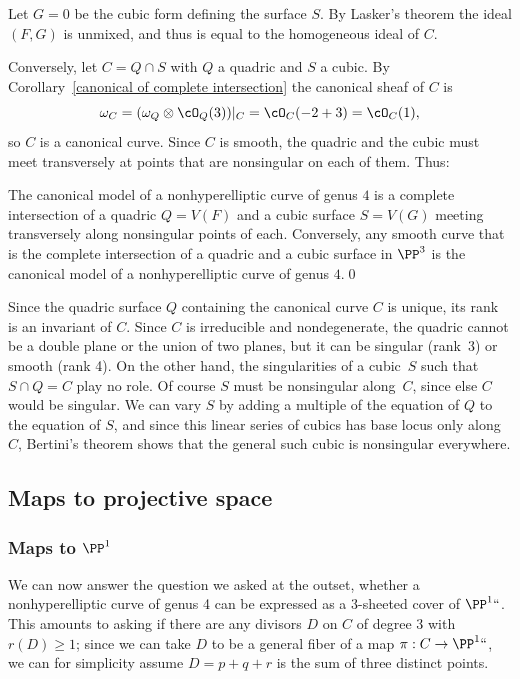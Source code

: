 Let $G=0$ be the cubic form defining the surface $S$. By
Lasker's theorem
%
the ideal $(F,G)$ is unmixed,
and thus is equal to the homogeneous ideal of $C$.

Conversely,
let $C = Q\cap S$ with $Q$ a quadric and $S$ a cubic. By Corollary~\ref{canonical of complete intersection} the canonical sheaf of $C$ is
$$
\omega_C = (\omega_{Q} \otimes \cO_{Q}(3))|_C = \cO_C(-2+3) = \cO_C(1)
,
$$
so $C$ is a canonical curve. Since $C$ is smooth, the quadric and the cubic must meet transversely at points that are nonsingular on each of them. Thus:

\begin{theorem}
\label{canonical genus 4}
The canonical model of a nonhyperelliptic curve of genus $4$ is a
%
%
complete intersection of a quadric $Q = V(F)$ and a cubic surface
$S=V(G)$ meeting transversely along nonsingular points of each.
Conversely, any smooth curve that is the complete intersection of a
quadric and a cubic surface in $\PP^3$ is the canonical model of a
nonhyperelliptic curve of genus $4$.\qed
\end{theorem}

Since the quadric surface $Q$ containing the canonical curve $C$
is unique, its rank is an invariant of $C$.
Since $C$ is irreducible and nondegenerate, the quadric cannot be a
double plane or the union of two planes, but it can be singular
(rank~3) or smooth (rank 4). On the other hand, the singularities of a
cubic~$S$ such that $S\cap Q = C$ play no role. Of course $S$ must be
nonsingular along~$C$, since else
$C$ would be singular. We can vary $S$ by adding a multiple of the
equation of $Q$ to the equation of $S$, and since this linear series
of cubics has base locus only along $C$,
Bertini's theorem
%
shows that the general such cubic is nonsingular everywhere.

\subsection*{Maps to projective space}

\subsubsection*{Maps to $\PP^1$}

We can now answer the question we asked at the outset, whether a
nonhyperelliptic curve of genus 4 can be expressed as a 3-sheeted
%
cover of $\PP^1` `$. This amounts to asking if there are any divisors
$D$ on $C$ of degree 3 with $r(D) \geq 1$; since we can take $D$ to be
a general fiber of a map $\pi : C \to \PP^1` `$, we can for simplicity
assume $D = p+q+r$ is the sum of three distinct points.


